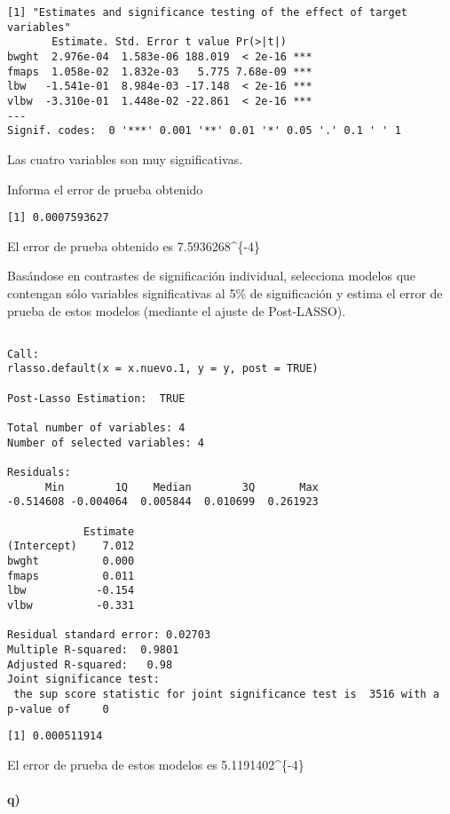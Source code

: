 \documentclass[]{article}
\let\oldparagraph\paragraph
\renewcommand{\paragraph}[1]{\oldparagraph{#1}\mbox{}}
\begin{document}
\begin{verbatim}
[1] "Estimates and significance testing of the effect of target variables"
       Estimate. Std. Error t value Pr(>|t|)    
bwght  2.976e-04  1.583e-06 188.019  < 2e-16 ***
fmaps  1.058e-02  1.832e-03   5.775 7.68e-09 ***
lbw   -1.541e-01  8.984e-03 -17.148  < 2e-16 ***
vlbw  -3.310e-01  1.448e-02 -22.861  < 2e-16 ***
---
Signif. codes:  0 '***' 0.001 '**' 0.01 '*' 0.05 '.' 0.1 ' ' 1
\end{verbatim}

Las cuatro variables son muy significativas.

Informa el error de prueba obtenido

\begin{verbatim}
[1] 0.0007593627
\end{verbatim}

El error de prueba obtenido es 7.5936268\^{}\{-4\}

Basándose en contrastes de significación individual, selecciona modelos
que contengan sólo variables significativas al 5\% de significación y
estima el error de prueba de estos modelos (mediante el ajuste de
Post-LASSO).

\begin{verbatim}

Call:
rlasso.default(x = x.nuevo.1, y = y, post = TRUE)

Post-Lasso Estimation:  TRUE 

Total number of variables: 4
Number of selected variables: 4 

Residuals: 
      Min        1Q    Median        3Q       Max 
-0.514608 -0.004064  0.005844  0.010699  0.261923 

            Estimate
(Intercept)    7.012
bwght          0.000
fmaps          0.011
lbw           -0.154
vlbw          -0.331

Residual standard error: 0.02703
Multiple R-squared:  0.9801
Adjusted R-squared:   0.98
Joint significance test:
 the sup score statistic for joint significance test is  3516 with a p-value of     0
\end{verbatim}

\begin{verbatim}
[1] 0.000511914
\end{verbatim}

El error de prueba de estos modelos es 5.1191402\^{}\{-4\}

\paragraph{q)}\label{q}
\end{document}
